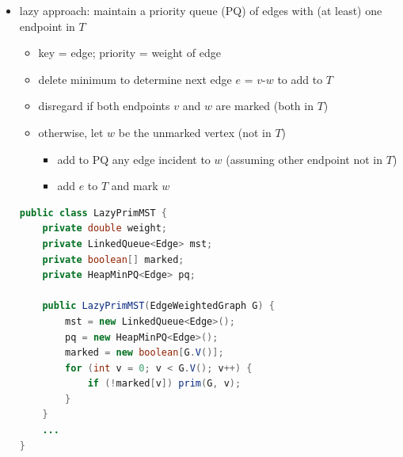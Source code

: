 \documentclass[8pt,a4paper,compress]{beamer}
\begin{document}
\begin{frame}[fragile]
\begin{itemize}
\item lazy approach: maintain a priority queue (PQ) of edges with (at least) one endpoint in $T$
\begin{itemize}
\item key = edge; priority = weight of edge

\item delete minimum to determine next edge $e$ = $v$-$w$ to add to $T$

\item disregard if both endpoints $v$ and $w$ are marked (both in $T$)

\item otherwise, let $w$ be the unmarked vertex (not in $T$)
\begin{itemize}
\item add to PQ any edge incident to $w$ (assuming other endpoint not in $T$)
\item add $e$ to $T$ and mark $w$
\end{itemize}
\end{itemize}

\begin{lstlisting}[language=Java]
public class LazyPrimMST {
    private double weight; 
    private LinkedQueue<Edge> mst; 
    private boolean[] marked; 
    private HeapMinPQ<Edge> pq; 

    public LazyPrimMST(EdgeWeightedGraph G) {
        mst = new LinkedQueue<Edge>();
        pq = new HeapMinPQ<Edge>();
        marked = new boolean[G.V()];
        for (int v = 0; v < G.V(); v++) {
            if (!marked[v]) prim(G, v);  
        }  
    }
    ...
}
\end{lstlisting}
\end{itemize}
\end{frame}
\end{document}
